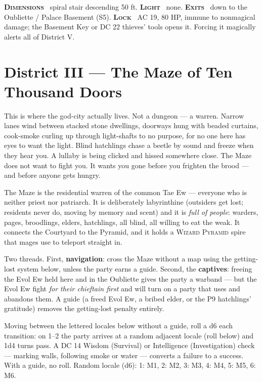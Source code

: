 \documentclass[10pt,twoside]{article}
\newcommand{\tech}[1]{\textbf{\scshape\textcolor{stone}{#1}}\ }
\newcommand{\eqname}[1]{\textsc{#1}}
\begin{document}
\begin{techbox}
\tech{Dimensions} spiral stair descending 50 ft. \tech{Light} none. \tech{Exits} down
to the Oubliette / Palace Basement (S5). \tech{Lock} AC 19, 80 HP, immune to
nonmagical damage; the Basement Key or DC 22 thieves' tools opens it. Forcing it
magically alerts all of District V.
\end{techbox}
\clearpage
\section{District III --- The Maze of Ten Thousand Doors}

\begin{readaloud}
This is where the god-city actually lives. Not a dungeon --- a warren. Narrow lanes
wind between stacked stone dwellings, doorways hung with beaded curtains, cook-smoke
curling up through light-shafts to no purpose, for no one here has eyes to want the
light. Blind hatchlings chase a beetle by sound and freeze when they hear you. A
lullaby is being clicked and hissed somewhere close. The Maze does not want to fight
you. It wants you gone before you frighten the brood --- and before anyone gets
hungry.
\end{readaloud}

The Maze is the residential warren of the common Tae Ew --- everyone who is neither
priest nor patriarch. It is deliberately labyrinthine (outsiders get lost; residents
never do, moving by memory and scent) and it is \emph{full of people}: warders, pages,
broodlings, elders, hatchlings, all blind, all willing to eat the weak. It connects
the Courtyard to the Pyramid, and it holds a \eqname{Wizard Pyramid} spire that
mages use to teleport straight in.

\begin{dmnote}
Two threads. First, \textbf{navigation}: cross the Maze without a map using the
getting-lost system below, unless the party earns a guide. Second, the
\textbf{captives}: freeing the Evol Ew held here and in the Oubliette gives the party
a warband --- but the Evol Ew fight \emph{for their chieftain first} and will turn on a
party that uses and abandons them. A guide (a freed Evol Ew, a bribed elder, or the
P9 hatchlings' gratitude) removes the getting-lost penalty entirely.
\end{dmnote}

\begin{dmnote}
Moving between the lettered locales below without a guide, roll a d6 each transition:
on 1--2 the party arrives at a random adjacent locale (roll below) and 1d4 turns
pass. A DC 14 Wisdom (Survival) or Intelligence (Investigation) check --- marking
walls, following smoke or water --- converts a failure to a success. With a guide, no
roll. Random locale (d6): 1: M1, 2: M2, 3: M3, 4: M4, 5: M5, 6: M6.
\end{dmnote}
\end{document}
